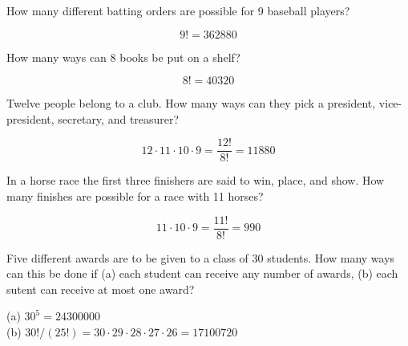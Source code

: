 \documentclass[answers,11pt]{exam}
\begin{document}
\begin{questions}


\question How many different batting orders are possible for 9 baseball players?

\begin{solution}
\[
  9! = 362880
\]
\end{solution}



\question How many ways can 8 books be put on a shelf?

\begin{solution}
\[
  8! = 40320
\]
\end{solution}



\newpage


\question Twelve people belong to a club.  How many ways can they pick a
president, vice-president, secretary, and treasurer?

\begin{solution}
\[
  12 \cdot 11 \cdot 10 \cdot 9 = \frac{12!}{8!} = 11880
\]
\end{solution}



\question In a horse race the first three finishers are said to win, place, and
show.  How many finishes are possible for a race with 11 horses?

\begin{solution}
\[
  11 \cdot 10 \cdot 9 = \frac{11!}{8!} = 990
\]
\end{solution}



\question Five different awards are to be given to a class of 30 students.  How
many ways can this be done if (a) each student can receive any number of
awards, (b) each sutent can receive at most one award?

\begin{solution}
(a) $30^5 = 24300000$ \\
(b) $30!/(25!) = 30 \cdot 29 \cdot 28 \cdot 27 \cdot 26 = 17100720$
\end{solution}


\end{questions}
\end{document}
